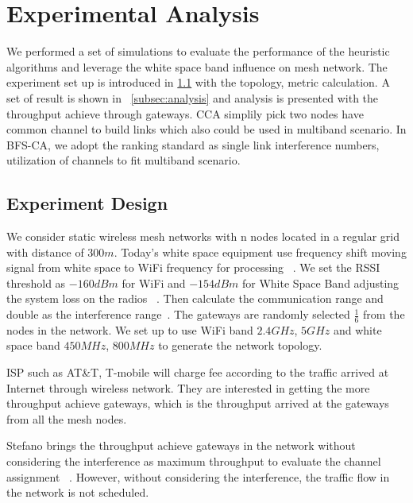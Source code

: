 \section{Experimental Analysis}
\label{sec:experimentdesign}

We performed a set of simulations to evaluate the performance of the heuristic algorithms and leverage the white space band influence on mesh network. 
The experiment set up is introduced in \ref{subsec:design} with the topology, metric calculation.
A set of result is shown in ~\ref{subsec:analysis} and analysis is presented with the throughput achieve through gateways.
CCA simplily pick two nodes have common channel to build links which also could be used in multiband scenario.
In BFS-CA, we adopt the ranking standard as single link interference numbers, utilization of channels to fit multiband scenario.


\subsection{Experiment Design}
\label{subsec:design}
We consider static wireless mesh networks with n nodes located in a regular grid with distance of $300m$. 
Today's white space equipment use frequency shift moving signal from white space to WiFi frequency for processing ~\cite{Ubnt}.
We set the RSSI threshold as $-160dBm$ for WiFi and $-154dBm$ for White Space Band adjusting the system loss on the radios ~\cite{cui2013leveraging}.
Then calculate the communication range and double as the interference range~\cite{raniwala2005architecture}. The gateways are randomly selected $\frac{1}{6}$ from the nodes in the network.
We set up to use WiFi band $2.4 GHz$, $5 GHz$ and white space band $450 MHz$, $800 MHz$ to generate the network topology.

ISP such as AT\&T, T-mobile will charge fee according to the traffic arrived at Internet through wireless network. 
They are interested in getting the more throughput achieve gateways, which is the throughput arrived at the gateways from all the mesh nodes. 

Stefano brings the throughput achieve gateways in the network without considering the interference as maximum throughput to evaluate the channel assignment ~\cite{avallone2008channel}. 
However, without considering the interference, the traffic flow in the network is not scheduled.

